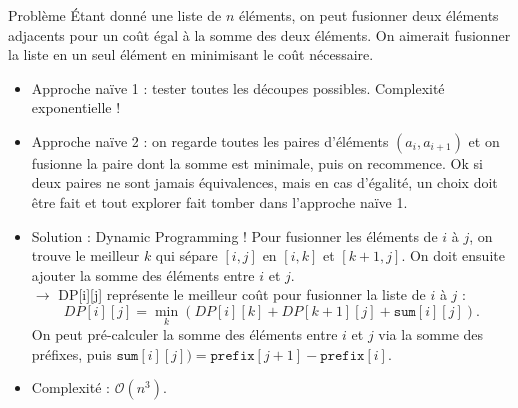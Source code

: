 \begin{frame}
    \frametitle{\problemtitle}
    \begin{block}{Problème}
        Étant donné une liste de $n$ éléments, on peut fusionner deux éléments adjacents pour un coût égal à la somme des deux éléments. On aimerait fusionner la liste en un seul élément en minimisant le coût nécessaire.
    \end{block}
    \pause
    \begin{itemize}[<+->]
        \item Approche naïve 1 : tester toutes les découpes possibles. Complexité exponentielle !
        \item Approche naïve 2 : on regarde toutes les paires d'éléments $(a_i,a_{i+1})$ et on fusionne la paire dont la somme est minimale, puis on recommence. Ok si deux paires ne sont jamais équivalences, mais en cas d'égalité, un choix doit être fait et tout explorer fait tomber dans l'approche naïve 1.
        \item Solution : Dynamic Programming ! Pour fusionner les éléments de $i$ à $j$, on trouve le meilleur $k$ qui sépare $[i,j]$ en $[i,k]$ et $[k+1,j]$. On doit ensuite ajouter la somme des éléments entre $i$ et $j$. \\
        $\rightarrow$ DP[i][j] représente le meilleur coût pour fusionner la liste de $i$ à $j$ :
        \[
        DP[i][j] = \min_{k}(DP[i][k] + DP[k+1][j] + \texttt{sum}[i][j]).
        \]
        On peut pré-calculer la somme des éléments entre $i$ et $j$ via la somme des préfixes, puis $\texttt{sum}[i][j]) = \texttt{prefix}[j+1] - \texttt{prefix}[i]$.
        \item Complexité : $\mathcal{O}(n^3)$.
    \end{itemize}

\end{frame}